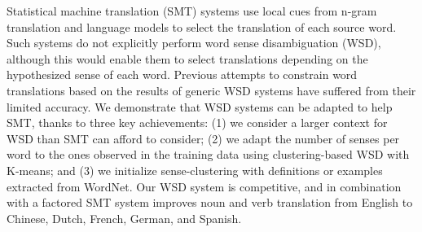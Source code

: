 Statistical machine translation (SMT) systems use local cues from n-gram translation and language models to select the translation of each source word. Such systems do not explicitly perform word sense disambiguation (WSD), although this would enable them to select translations depending on the hypothesized sense of each word.  Previous attempts to constrain word translations based on the results of generic WSD systems have suffered from their limited accuracy.  We demonstrate that WSD systems can be adapted to help SMT, thanks to three key achievements: (1) we consider a larger context for WSD than SMT can afford to consider; (2) we adapt the number of senses per word to the ones observed in the training data using clustering-based WSD with K-means; and (3) we initialize sense-clustering with definitions or examples extracted from WordNet.  Our WSD system is competitive, and in combination with a factored SMT system improves noun and verb translation from English to Chinese, Dutch, French, German, and Spanish.
